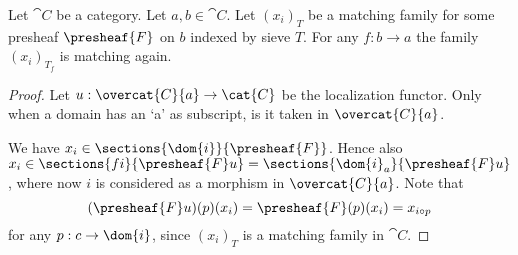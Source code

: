 \begin{lemma}
Let $\cat{C}$ be a category.
Let $a,b\in \cat{C}$.
Let $(x_i)_T$ be a matching family for some presheaf $\presheaf{F}$ on $b$
indexed by sieve $T$.
For any $f:b \rightarrow a$ the family
$(x_i)_{T_f}$ is matching again.
\end{lemma}

\begin{proof}
Let $u: \overcat{C}{a} \rightarrow \cat{C}$ be the localization functor.
Only when a domain has an `a' as subscript, is it taken in $\overcat{C}{a}$.

We have $x_{i} \in \sections{\dom{i}}{\presheaf{F}}$.
Hence also $x_{i} \in \sections{fi}{\presheaf{F}u} = \sections{\dom{i}_a}{\presheaf{F}u}$,
where now $i$ is considered as a morphism in $\overcat{C}{a}$.
Note that 
\[(\presheaf{F}u)(p)(x_{i}) 
	= \presheaf{F}(p)(x_{i}) =x_{i \circ p}
\]
for any $p:c \rightarrow \dom{i}$,
since $(x_{i})_T$ is a matching family in $\cat{C}$.
\end{proof}




